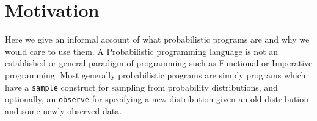 





\section{Motivation}
\label{sec:motivation}
Here we give an informal account of what probabilistic programs are and why we would care to use them.
A Probabilistic programming language is not an established or general paradigm of programming such as Functional or Imperative programming.
Most generally probabilistic programs are simply programs which have a \texttt{sample} construct for sampling from probability distributions,
and optionally, an \texttt{observe} for specifying a new distribution given an old distribution and some newly observed data.

